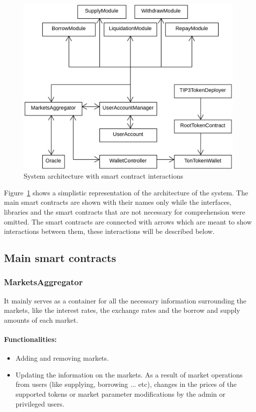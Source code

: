 \begin{figure}[h!]
  \includegraphics[width=\textwidth]{./assets/archi.png}
  \caption{System architecture with smart contract interactions}
  \label{fig:archi}
  \captionsetup[figure]{list=no} %
\end{figure}

Figure~\ref{fig:archi} shows a simplistic representation of the architecture of the system. The main smart contracts are shown with their names only while the interfaces, libraries and the smart contracts that are not necessary for comprehension were omitted. The smart contracts are connected with arrows which are meant to show interactions between them, these interactions will be described below.

\subsection{Main smart contracts}

\subsubsection{MarketsAggregator}

It mainly serves as a container for all the necessary information surrounding the markets, like the interest rates, the exchange rates and the borrow and supply amounts of each market.

\paragraph*{Functionalities:}
\begin{itemize}
  \item Adding and removing markets.
  \item Updating the information on the markets. As a result of market operations from users (like supplying, borrowing ... etc), changes in the prices of the supported tokens or market parameter modifications by the admin or privileged users.
\end{itemize}

